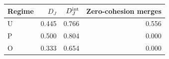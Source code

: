 \begin{tabular}{lrrr}\toprule
	Regime & $D_J$ & $D_J^{\rm int}$ & Zero-cohesion merges\\\midrule
	U & 0.445 & 0.766 & 0.556\\
	P & 0.500 & 0.804 & 0.000\\
	O & 0.333 & 0.654 & 0.000\\
	\bottomrule
\end{tabular}
